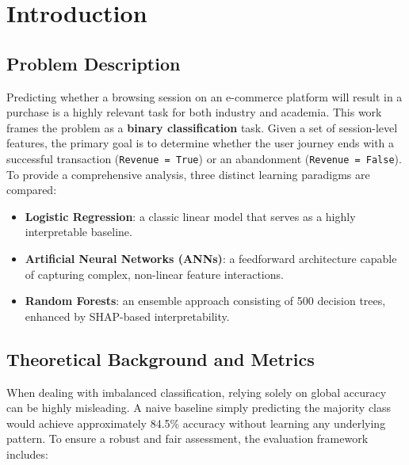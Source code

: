 \section{Introduction}

\subsection{Problem Description}

Predicting whether a browsing session on an e-commerce platform will result in a purchase is a highly relevant task for both industry and academia. This work frames the problem as a \textbf{binary classification} task. Given a set of session-level features, the primary goal is to determine whether the user journey ends with a successful transaction (\texttt{Revenue = True}) or an abandonment (\texttt{Revenue = False}). To provide a comprehensive analysis, three distinct learning paradigms are compared:

\begin{itemize}
    \item \textbf{Logistic Regression}: a classic linear model that serves as a highly interpretable baseline.
    \item \textbf{Artificial Neural Networks (ANNs)}: a feedforward architecture capable of capturing complex, non-linear feature interactions.
    \item \textbf{Random Forests}: an ensemble approach consisting of 500 decision trees, enhanced by SHAP-based interpretability.
\end{itemize}

\subsection{Theoretical Background and Metrics}

When dealing with imbalanced classification, relying solely on global accuracy can be highly misleading. A naive baseline simply predicting the majority class would achieve approximately 84.5\% accuracy without learning any underlying pattern. To ensure a robust and fair assessment, the evaluation framework includes:

